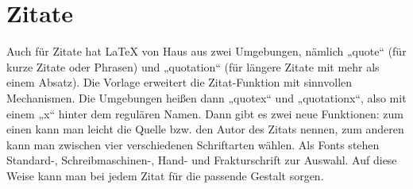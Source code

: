 			\newline
				
			\newline
		
		\section{Zitate}
		
			Auch für Zitate hat \LaTeX{} von Haus aus zwei Umgebungen, nämlich „quote“ (für kurze Zitate oder Phrasen) und „quotation“ (für längere Zitate mit mehr als einem Absatz). Die Vorlage erweitert die Zitat-Funktion mit sinnvollen Mechanismen. Die Umgebungen heißen dann „quotex“ und „quotationx“, also mit einem „x“ hinter dem regulären Namen. Dann gibt es zwei neue Funktionen: zum einen kann man leicht die Quelle bzw. den Autor des Zitats nennen, zum anderen kann man zwischen vier verschiedenen Schriftarten wählen. Als Fonts stehen Standard-, Schreibmaschinen-, Hand- und Frakturschrift zur Auswahl. Auf diese Weise kann man bei jedem Zitat für die passende Gestalt sorgen. 
			

